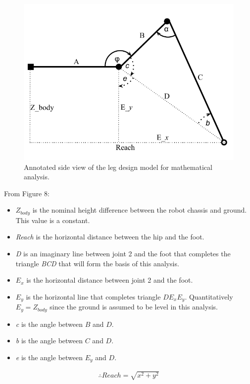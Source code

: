 \begin{figure}[h]
\centering
\includegraphics[scale = 1]{pics/Leg_design_4.pdf}
\caption{Annotated side view of the leg design model for mathematical analysis.}
\label{fig:Leg_design_4}
\end{figure}

From Figure 8:
\begin{itemize}
\item $Z_{body}$ is the nominal height difference between the robot chassis and ground. This value is a constant.
\item \textit{Reach} is the horizontal distance between the hip and the foot.
\item \textit{D} is an imaginary line between joint 2 and the foot that completes the triangle \textit{BCD} that will form the basis of this analysis.
\item $E_x$ is the horizontal distance between joint 2 and the foot.
\item $E_y$ is the horizontal line that completes triangle $DE_xE_y$. Quantitatively $E_y = Z_{body}$ since the ground is assumed to be level in this analysis.
\item \textit{c} is the angle between $B$ and $D$.
\item \textit{b} is the angle between $C$ and $D$.
\item \textit{e} is the angle between $E_y$ and $D$.
\end{itemize}

\begin{align}
\therefore Reach = \sqrt{x^2+y^2}
\end{align}

